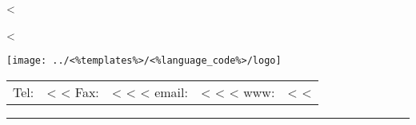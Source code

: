 \parbox{\textwidth}{%
  \parbox[b]{.42\textwidth}{%
    <%
   
    <%
  }
  \parbox[b]{.2\textwidth}{
    \texttt{[image: ../<\%templates\%>/<\%language\_code\%>/logo]}
  }\hfill
  \begin{tabular}[b]{rl@{}}
  Tel: & <%
  <%
  Fax: & <%
  <%
  <%
  email: & <%
  <%
  <%
  www: & <%
  <%
  \end{tabular}

  \rule[1.5em]{\textwidth}{0.5pt}
}

